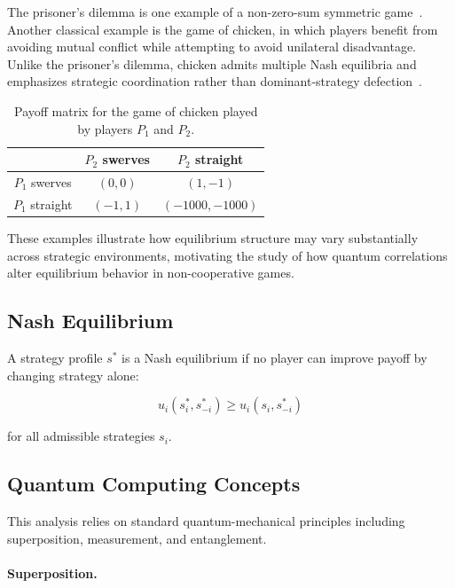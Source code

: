 The prisoner's dilemma is one example of a non-zero-sum symmetric game~\cite{nash}. Another classical example is the game of chicken, in which players benefit from avoiding mutual conflict while attempting to avoid unilateral disadvantage. Unlike the prisoner's dilemma, chicken admits multiple Nash equilibria and emphasizes strategic coordination rather than dominant-strategy defection~\cite{jankowski}.

\begin{table}[H]
	\centering
	\caption{Payoff matrix for the game of chicken played by players $P_1$ and $P_2$.}
	\label{tab:chicken}
	
	\renewcommand{\arraystretch}{2}
	\setlength{\tabcolsep}{8pt}
	
	\begin{tabular}{c|c|c}
		& $P_2$ swerves & $P_2$ straight \\
		\hline
		$P_1$ swerves  & $(0,0)$ & $(1,-1)$ \\
		\hline
		$P_1$ straight & $(-1,1)$ & $(-1000,-1000)$
	\end{tabular}
\end{table}

These examples illustrate how equilibrium structure may vary substantially across strategic environments, motivating the study of how quantum correlations alter equilibrium behavior in non-cooperative games.

\subsection{Nash Equilibrium}

A strategy profile $s^*$ is a Nash equilibrium if no player can improve payoff by changing strategy alone:

\begin{equation}
	u_i(s_i^*, s_{-i}^*)
	\ge
	u_i(s_i, s_{-i}^*)
\end{equation}

for all admissible strategies $s_i$.

\subsection{Quantum Computing Concepts}

This analysis relies on standard quantum-mechanical principles including superposition, measurement, and entanglement.

\paragraph{Superposition.}

